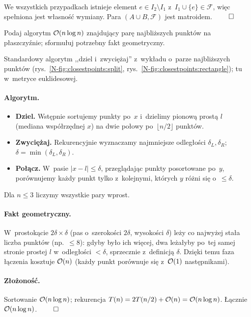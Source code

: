 We wszystkich przypadkach istnieje element $e\in I_2\setminus I_1$ z~$I_1\cup\{e\}
\in\mathcal{F}$, więc spełniona jest własność wymiany. Para $(A\cup B,\mathcal{F})$
jest matroidem. $\qed$

\clearpage
\begin{zadanie}
	Podaj algorytm $\mathcal{O}(n\log n)$ znajdujący parę najbliższych punktów na
	płaszczyźnie; sformułuj potrzebny fakt geometryczny.
\end{zadanie}

Standardowy algorytm ,,dziel i~zwyciężaj'' z~wykładu o~parze najbliższych
punktów (rys.~\ref{N-fig:closestpoints:split},
rys.~\ref{N-fig:closestpoints:rectangle}); tu w~metryce euklidesowej.

\paragraph{Algorytm.}
\begin{itemize}[nosep]
	\item \textbf{Dziel.} Wstępnie sortujemy punkty po~$x$ i~dzielimy pionową
	      prostą $l$ (mediana współrzędnej $x$) na dwie połowy po~$\lfloor n/2\rfloor$
	      punktów.
	\item \textbf{Zwyciężaj.} Rekurencyjnie wyznaczamy najmniejsze odległości
	      $\delta_L,\delta_R$; $\delta=\min(\delta_L,\delta_R)$.
	\item \textbf{Połącz.} W~pasie $|x-l|\le\delta$, przeglądając punkty
	      posortowane po~$y$, porównujemy każdy punkt tylko z~kolejnymi, których
	      $y$ różni się o~$\le\delta$.
\end{itemize}
Dla $n\le 3$ liczymy wszystkie pary wprost.

\paragraph{Fakt geometryczny.}
W~prostokącie $2\delta\times\delta$ (pas o~szerokości $2\delta$, wysokości
$\delta$) leży co najwyżej stała liczba punktów (np.\ $\le 8$): gdyby było ich
więcej, dwa leżałyby po~tej samej stronie prostej $l$ w~odległości $<\delta$,
sprzecznie z~definicją $\delta$. Dzięki temu faza łączenia kosztuje $\mathcal{O}(n)$
(każdy punkt porównuje się z~$\mathcal{O}(1)$ następnikami).

\paragraph{Złożoność.}
Sortowanie $\mathcal{O}(n\log n)$; rekurencja $T(n)=2T(n/2)+\mathcal{O}(n)=\mathcal{O}(n\log n)$.
Łącznie $\mathcal{O}(n\log n)$. $\qed$

